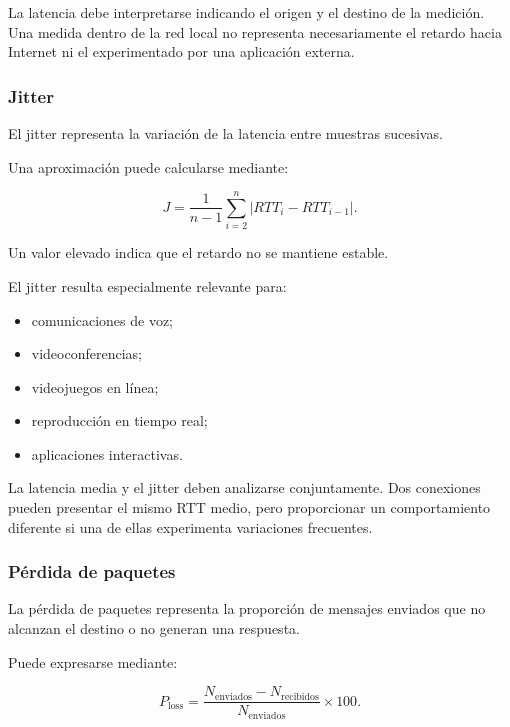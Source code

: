 La latencia debe interpretarse indicando el origen y el destino de la
medición. Una medida dentro de la red local no representa necesariamente
el retardo hacia Internet ni el experimentado por una aplicación
externa.


\subsubsection*{Jitter}

El jitter representa la variación de la latencia entre muestras
sucesivas.

Una aproximación puede calcularse mediante:

\[
    J
    =
    \frac{
        1
    }{
        n-1
    }
    \sum_{i=2}^{n}
    \left|
        RTT_i
        -
        RTT_{i-1}
    \right|.
\]

Un valor elevado indica que el retardo no se mantiene estable.

El jitter resulta especialmente relevante para:

\begin{itemize}
    \item comunicaciones de voz;

    \item videoconferencias;

    \item videojuegos en línea;

    \item reproducción en tiempo real;

    \item aplicaciones interactivas.
\end{itemize}

La latencia media y el jitter deben analizarse conjuntamente. Dos
conexiones pueden presentar el mismo RTT medio, pero proporcionar un
comportamiento diferente si una de ellas experimenta variaciones
frecuentes.


\subsubsection*{Pérdida de paquetes}

La pérdida de paquetes representa la proporción de mensajes enviados que
no alcanzan el destino o no generan una respuesta.

Puede expresarse mediante:

\[
    P_{\mathrm{loss}}
    =
    \frac{
        N_{\mathrm{enviados}}
        -
        N_{\mathrm{recibidos}}
    }{
        N_{\mathrm{enviados}}
    }
    \times
    100.
\]

